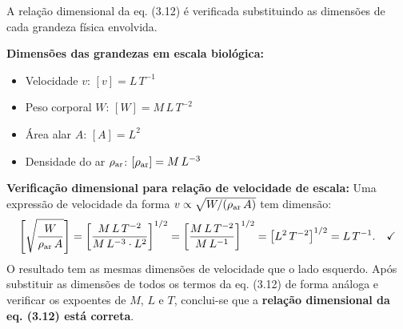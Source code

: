 A relação dimensional da eq. (3.12) é verificada substituindo as dimensões de cada grandeza física envolvida.

\textbf{Dimensões das grandezas em escala biológica:}
\begin{itemize}
\item Velocidade $v$: $[v] = L\,T^{-1}$
\item Peso corporal $W$: $[W] = M\,L\,T^{-2}$
\item Área alar $A$: $[A] = L^{2}$
\item Densidade do ar $\rho_{\rm ar}$: $[\rho_{\rm ar}] = M\,L^{-3}$
\end{itemize}

\textbf{Verificação dimensional para relação de velocidade de escala:}
Uma expressão de velocidade da forma $v\propto\sqrt{W/(\rho_{\rm ar}\,A)}$ tem dimensão:
\[
\left[\sqrt{\frac{W}{\rho_{\rm ar}\,A}}\right] = \left[\frac{M\,L\,T^{-2}}{M\,L^{-3}\cdot L^{2}}\right]^{1/2} = \left[\frac{M\,L\,T^{-2}}{M\,L^{-1}}\right]^{1/2} = \left[L^{2}\,T^{-2}\right]^{1/2} = L\,T^{-1}.\quad\checkmark
\]
O resultado tem as mesmas dimensões de velocidade que o lado esquerdo. Após substituir as dimensões de todos os termos da eq. (3.12) de forma análoga e verificar os expoentes de $M$, $L$ e $T$, conclui-se que a \textbf{relação dimensional da eq. (3.12) está correta}.

